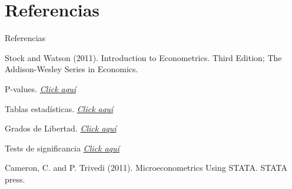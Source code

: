 \section{Referencias}
\begin{frame}{Referencias}
	\begin{thebibliography}{00}
		\beamertemplatebookbibitems
		Stock and Watson (2011). Introduction to Econometrics.
		Third Edition; The Addison-Wesley Series in Economics.
		
		\beamertemplateonlinebibitems
		P-values. \href{http://www.tutor-homework.com/statistics_tables/statistics_tables.html}{\em Click aquí}
		
		\beamertemplatearticlebibitems
		Tablas estadísticas. \href{http://verso.mat.uam.es/~pablo.fernandez/tablas_ProbI_2007-2008.pdf}{\em Click aquí}
		
		\beamertemplatearticlebibitems
		Grados de Libertad. \href{https://en.wikipedia.org/wiki/Degrees_of_freedom_(statistics)}{\em Click aquí}
		
		\beamertemplateonlinebibitems
		Tests de significancia \href{http://www.stat.yale.edu/Courses/1997-98/101/sigtest.htm}{\em Click aquí}
		
		\beamertemplatebookbibitems
		Cameron, C. and P. Trivedi (2011). Microeconometrics
		Using STATA. STATA press.
	\end{thebibliography}
\end{frame}





